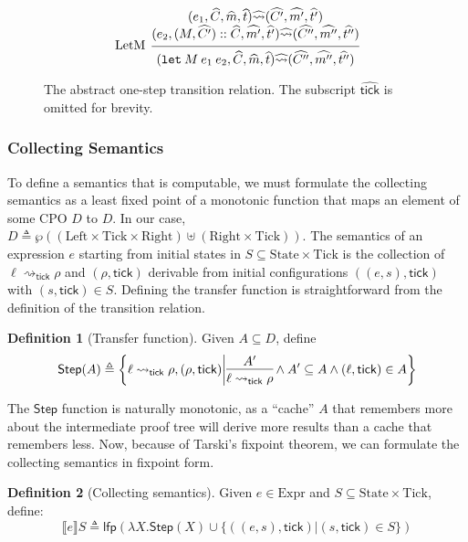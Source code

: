 \documentclass{article}
\theoremstyle{definition}
\newtheorem{definition}{Definition}[section]
\newcommand*{\cons}{::}
\newcommand*{\A}[1]{\widehat{#1}}
\newcommand*{\Expr}{\text{Expr}}
\newcommand*{\Left}{\text{Left}}
\newcommand*{\Right}{\text{Right}}
\newcommand*{\mem}{m}
\newcommand*{\State}{\text{State}}
\newcommand*{\Tick}{\text{Tick}}
\newcommand*{\semarrow}{\rightsquigarrow}
\newcommand*{\sembracket}[1]{\lBrack{#1}\rBrack}
\newcommand*{\tick}{\mathsf{tick}}
\begin{document}
\begin{figure}[h!]
  \[
    \begin{prooftree}
      \hypo{
        \begin{matrix}
          (e_{1}, \A{C}, \A\mem, \A{t})
          \A\semarrow
          (\A{C'}, \A{\mem'}, \A{t'}) \\
          (e_{2}, (M, \A{C'})\cons \A{C}, \A{\mem'}, \A{t'})
          \A\semarrow
          (\A{C''}, \A{\mem''}, \A{t''})
        \end{matrix}
      }
      \infer[left label=LetM]1{
      (\mathtt{let}\:M\:e_{1}\:e_{2}, \A{C}, \A\mem, \A{t})
      \A\semarrow
      (\A{C''}, \A{\mem''}, \A{t''})
      }
    \end{prooftree}
  \]
  \caption{The abstract one-step transition relation. The subscript $\A\tick$ is omitted for brevity.}
  \label{fig:absreach}
\end{figure}

\subsubsection{Collecting Semantics}
To define a semantics that is computable, we must formulate the collecting semantics as a least fixed point of a monotonic function that maps an element of some CPO $D$ to $D$.
In our case, $D\triangleq\wp((\Left\times\Tick\times\Right )\uplus(\Right\times\Tick))$.
The semantics of an expression $e$ starting from initial states in $S\subseteq\State\times\Tick$ is the collection of $\ell\semarrow_{\tick}\rho$ and $(\rho,\tick)$ derivable from initial configurations $((e,s),\tick)$ with $(s,\tick)\in S$.
Defining the transfer function is straightforward from the definition of the transition relation.

\begin{definition}[Transfer function]
  Given $A\subseteq D$, define
  \[
    \mathsf{Step}(A)\triangleq
    \left\{\ell\semarrow_\tick\rho, (\rho,\tick)\middle|
    \begin{prooftree}[center=true]
      \hypo{A'}\infer1{\ell\semarrow_\tick\rho}
    \end{prooftree}\wedge
    A'\subseteq A\wedge(\ell,\tick)\in A
    \right\}
  \]
\end{definition}

The $\mathsf{Step}$ function is naturally monotonic, as a ``cache'' $A$ that remembers more about the intermediate proof tree will derive more results than a cache that remembers less.
Now, because of Tarski's fixpoint theorem, we can formulate the collecting semantics in fixpoint form.
\begin{definition}[Collecting semantics]
  Given $e\in\Expr$ and $S\subseteq\State\times\Tick$, define:
  \[
    \sembracket{e}S\triangleq\mathsf{lfp}(\lambda X.\mathsf{Step}(X)\cup\{((e,s),\tick)|(s,\tick)\in S\})
  \]
\end{definition}
\end{document}
